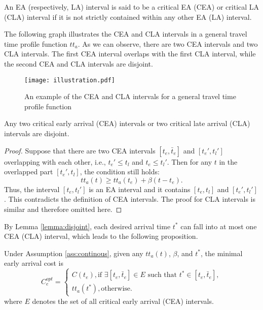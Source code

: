 \begin{definition}
 An EA (respectively, LA) interval is said to be a critical EA (CEA) or critical LA (CLA) interval if it is not strictly contained within any other EA (LA) interval.
\end{definition}

The following graph illustrates the CEA and CLA intervals in a general travel time profile function $tt_a$. As we can observe, there are two CEA intervals and two CLA intervals. The first CEA interval overlaps with the first CLA interval, while the second CEA and CLA intervals are disjoint.
 

\begin{figure}
  \centering
  \texttt{[image: illustration.pdf]}
  \caption{An example of the CEA and CLA intervals for a general travel time profile function}
  \label{fig:illustration}
\end{figure}



\begin{lemma}\label{lemma:disjoint}
Any two critical early arrival (CEA) intervals or two critical late arrival (CLA) intervals are disjoint.
\end{lemma}

\begin{proof}
Suppose that there are two CEA intervals $[t_e, \bar t_e]$ and $[t_e', t_l']$ overlapping with each other, i.e., $t_e' \le t_l$ and $t_e \le t_l'$. Then for any $t$ in the overlapped part $[t_e', t_l]$, the condition still holds: 
$$
tt_a(t ) \ge tt_a(t_e)  + \beta (t - t_e ).
$$
Thus, the interval $[t_e, t_l']$ is an EA interval and it contains  $[t_e, t_l]$ and $[t_e', t_l']$. This contradicts the definition of CEA intervals. The proof for CLA intervals is similar and therefore omitted here. 
\end{proof}

By Lemma \ref{lemma:disjoint}, each desired arrival time $t^*$ can fall into at most one CEA (CLA) interval, which leads to the following proposition. 

\begin{prop}
  \label{prop:into-early}
 Under Assumption \ref{ass:continous}, given any $tt_a(t)$, $\beta$, and $t^*$, the minimal early arrival cost is  
$$C_e^{opt} = \begin{cases}
    C(t_e),  \text{if }\exists [t_e, \bar{t}_e] \in E \text{ such that } t^* \in [t_e, \bar{t}_e],\\
     tt_a(t^*), \text{otherwise}. 
\end{cases}$$
where $E$ denotes the set of all critical early arrival (CEA) intervals.
\end{prop}


